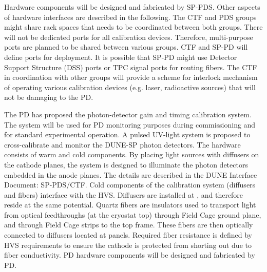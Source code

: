 Hardware components will be designed and fabricated by SP-PDS. Other aspects of hardware interfaces are described in the following. The CTF and PDS groups might share rack spaces that needs to be coordinated between both groups. There will not be dedicated ports for all calibration devices. Therefore, multi-purpose ports are planned to be shared between various groups. CTF and SP-PD will define ports for deployment. It is possible that SP-PD might use Detector Support Structure (DSS) ports or TPC signal ports for routing fibers. The CTF in coordination with other groups will provide a scheme for interlock mechanism of operating various calibration devices (e.g. laser, radioactive sources) that will not be damaging to the PD. 

The PD has proposed the photon-detector gain and timing calibration system. The system will be used for PD monitoring purposes during commissioning and for standard experimental operation. A pulsed UV-light system is proposed to cross-calibrate and monitor the DUNE-SP photon detectors. The hardware consists of warm and cold components. By placing light sources with diffusers on the cathode planes, the system is designed to illuminate the photon detectors embedded in the anode planes. The details are described in the DUNE Interface Document: SP-PDS/CTF. Cold components of the calibration system (diffusers and fibers) interface with the HVS. Diffusers are installed at , and therefore reside at the same  potential. Quartz fibers are insulators used to transport light from optical feedthroughs (at the cryostat top) through Field Cage ground plane, and through Field Cage strips to the  top frame. These fibers are then optically connected to diffusers located at  panels. Required fiber resistance is defined by HVS requirements to ensure the cathode is protected from shorting out due to fiber conductivity. PD hardware components will be designed and fabricated by PD.







